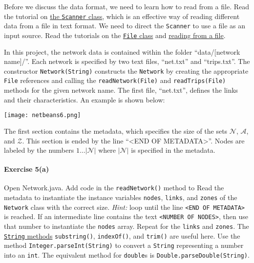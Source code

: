 \documentclass[11pt]{article}
\newcommand{\N}{\mathcal{N}}
\newcommand{\A}{\mathcal{A}}
\newcommand{\Z}{\mathcal{Z}}
\begin{document}
Before we discuss the data format, we need to learn how to read from a file. Read the tutorial on  \href{https://www.w3schools.com/java/java_user_input.asp}{the \texttt{Scanner} class}, which is an effective way of reading different data from a file in text format. We need to direct the \texttt{Scanner} to use a file as an input source. Read the tutorials on the \href{https://www.w3schools.com/java/java_files.asp}{\texttt{File} class} and \href{https://www.w3schools.com/java/java_files_read.asp}{reading from a file}. 

In this project, the network data is contained within the folder ``data/[network name]/''. Each network is specified by two text files, ``net.txt'' and ``trips.txt''.  The constructor \texttt{Network(String)} constructs the \texttt{Network} by creating the appropriate \texttt{File} references and calling the \texttt{readNetwork(File)} and \texttt{readTrips(File)} methods for the given network name. 
%
The first file, ``net.txt'', defines the links and their characteristics. An example is shown below:

\begin{center}
	\texttt{[image: netbeans6.png]}
\end{center}


\noindent The first section contains the metadata, which specifies the size of the sets $\N$, $\A$, and $\Z$. This section is ended by the line ``<END OF METADATA>''. Nodes are labeled by the numbers $1\ldots \vert\N\vert$ where $\vert\N\vert$ is specified in the metadata. 




\paragraph*{Exercise 5(a)} Open Network.java. Add code in the \texttt{readNetwork()} method to Read the metadata to instantiate the instance variables \texttt{nodes}, \texttt{links}, and \texttt{zones} of the \texttt{Network} class with the correct size. \textit{Hint:} loop until the line \texttt{<END OF METADATA>} is reached. If an intermediate line contains the text \texttt{<NUMBER OF NODES>}, then use that number to instantiate the \texttt{nodes} array. Repeat for the \texttt{links} and \texttt{zones}. The \href{https://www.w3schools.com/java/java_ref_string.asp}{\texttt{String} methods} \texttt{substring()}, \texttt{indexOf()}, and \texttt{trim()} are useful here. Use the method \texttt{Integer.parseInt(String)} to convert a \texttt{String} representing a number into an \texttt{int}. The equivalent method for \texttt{double}s is \texttt{Double.parseDouble(String)}.
\end{document}
